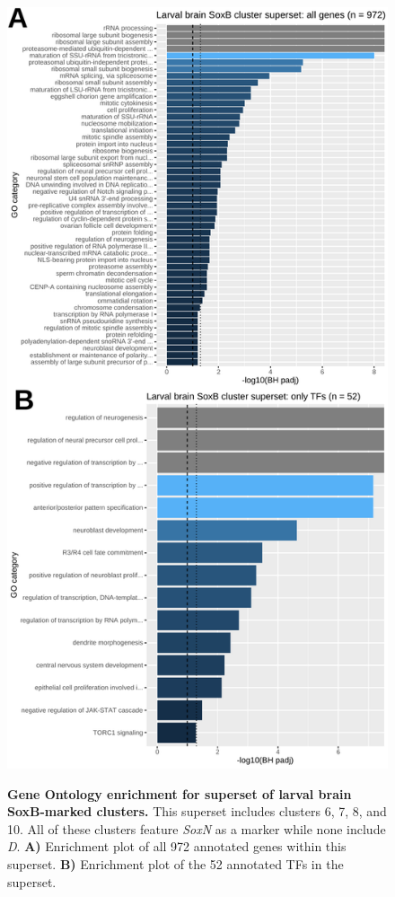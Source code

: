 \documentclass[withindex,glossary]{cam-thesis}
\begin{document}
\setcounter{figure}{13-1}
\begin{figure}[htbp]
\centering
\includegraphics[height=\dimexpr\textheight-68pt\relax,keepaspectratio]{figs/Fig13 avalos superset.pdf}
\label{fig13}
\caption{\textbf{Gene Ontology enrichment for superset of larval brain SoxB-marked clusters.} This superset includes clusters 6, 7, 8, and 10. All of these clusters feature \emph{SoxN} as a marker while none include \emph{D}. \textbf{A)} Enrichment plot of all 972 annotated genes within this superset. \textbf{B)} Enrichment plot of the 52 annotated TFs in the superset.}
\end{figure}
\end{document}
